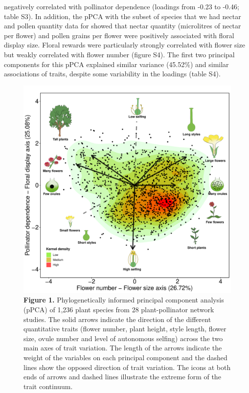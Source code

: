 \documentclass[
  12pt,
  a4paper,
]{article}
\begin{document}
negatively correlated with pollinator dependence (loadings from -0.23 to -0.46; table S3). In addition, the pPCA with the subset of species that we had nectar and pollen quantity data for showed that nectar quantity (microlitres of nectar per flower) and pollen grains per flower were positively associated with floral display size. Floral rewards were particularly strongly correlated with flower size but weakly correlated with flower number (figure S4). The first two principal components for this pPCA explained similar variance (45.52\%) and similar associations of traits, despite some variability in the loadings (table S4).

\begin{figure}[H]

{\centering \includegraphics[width=0.85\linewidth]{output/figures/unnamed-chunk-2-1} 

}

\caption{\textbf{Figure 1.} Phylogenetically informed principal component analysis (pPCA) of 1,236 plant species from 28 plant-pollinator network studies. The solid arrows indicate the direction of the different quantitative traits (flower number, plant height, style length, flower size, ovule number and level of autonomous selfing) across the two main axes of trait variation. The length of the arrows indicate the weight of the variables on each principal component and the dashed lines show the opposed direction of trait variation. The icons at both ends of arrows and dashed lines illustrate the extreme form of the trait continuum.}\label{fig:unnamed-chunk-2}
\end{figure}
\end{document}
